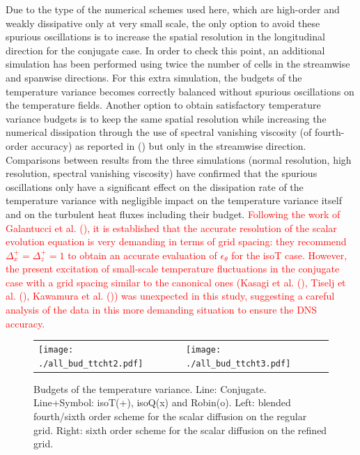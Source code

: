 \documentclass[review]{elsarticle}
\begin{document}
Due to the type of the numerical schemes used here, which are high-order and weakly dissipative only at very small scale, the only option to avoid these spurious oscillations is to increase the spatial resolution in the longitudinal direction for the conjugate case. In order to check this point, an additional simulation has been performed using twice the number of cells in the streamwise and spanwise directions. For this extra simulation, the budgets of the temperature variance becomes correctly balanced without spurious oscillations on the temperature fields. Another option to obtain satisfactory temperature variance budgets is to keep the same spatial resolution while increasing the numerical dissipation through the use of spectral vanishing viscosity (of fourth-order accuracy) as reported in (\cite{lamballais2011straightforward}) but only in the streamwise direction. Comparisons between results from the three simulations (normal resolution, high resolution, spectral vanishing viscosity) have confirmed that the spurious oscillations only have a significant effect on the dissipation rate of the temperature variance with negligible impact on the temperature variance itself and on the turbulent heat fluxes including their budget. \textcolor{red}{Following the work of Galantucci et al. (\cite{galantucci2010very}), it is established that the accurate resolution of the scalar evolution equation is very demanding in terms of grid spacing: they recommend $\Delta_x^+=\Delta_z^+=1$ to obtain an accurate evaluation of $\epsilon_\theta$ for the isoT case. However, the present excitation of small-scale temperature fluctuations in the conjugate case with a grid spacing similar to the canonical ones (Kasagi et al. (\cite{kasagi1992direct}), Tiselj et al. (\cite{Tiselj2001dns}), Kawamura et al. (\cite{kawamura1998dns})) was unexpected in this study, suggesting a careful analysis of the data in this more demanding situation to ensure the DNS accuracy.}

\begin{figure}[htbp]
\begin{tabular}[htbp]{ll}
\texttt{[image: ./all\_bud\_ttcht2.pdf]} &
\texttt{[image: ./all\_bud\_ttcht3.pdf]}
\end{tabular}
\caption{Budgets of the temperature variance. Line: Conjugate. Line+Symbol: isoT(+), isoQ(x) and Robin(o). Left: blended fourth/sixth order scheme for the scalar diffusion on the regular grid. Right: sixth order scheme for the scalar diffusion on the refined grid.}
\label{all_bud_tt2}
\end{figure}
\end{document}
